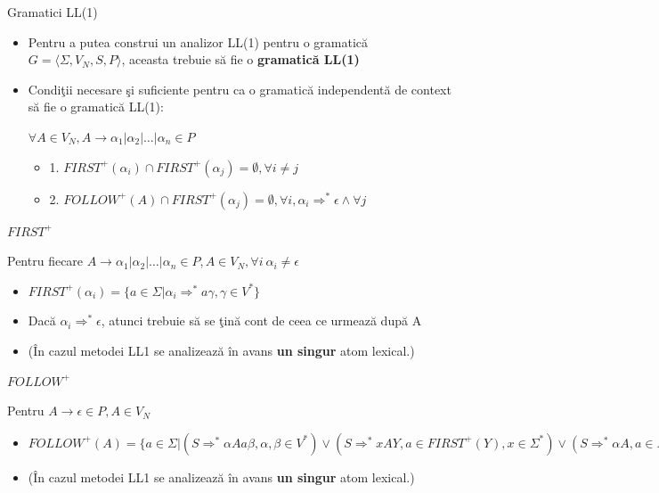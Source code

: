 \documentclass[pdf]{beamer}
\begin{document}
\begin{frame}{Gramatici LL(1)}

\begin{itemize}
\item
Pentru a putea construi un analizor LL(1) pentru o gramatică $G=\langle \Sigma, V_N, S, P \rangle$, aceasta trebuie să fie o \textbf{gramatică LL(1)}

\item
Condiţii necesare şi suficiente pentru ca o gramatică independentă de context să fie o gramatică LL(1):

$\forall A \in V_N, A \to \alpha{_1} | \alpha{_2} | \dots | \alpha{_n} \in P$

\begin{itemize}
\item
1. $FIRST^+(\alpha{_i}) \cap FIRST^+ (\alpha{_j}) =\emptyset, \forall i \neq j$

\item
2. $FOLLOW^+(A) \cap FIRST^+ (\alpha{_j}) = \emptyset, \forall i, \alpha{_i} \Rightarrow^{*} \epsilon \wedge \forall j$
\end{itemize}
\end{itemize}
\end{frame}



\begin{frame}{$FIRST^+$}

Pentru fiecare $A \to \alpha{_1} | \alpha{_2} | \dots | \alpha{_n} \in P, A \in V_N, \forall i \  \alpha_i \neq \epsilon$

\begin{itemize}
\item
$FIRST^+(\alpha_i) = \{ a \in \Sigma | \alpha_i \Rightarrow^* a \gamma, \gamma \in V^{*} \}$

\item
Dacă $\alpha_i \Rightarrow^* \epsilon$, atunci trebuie să se ţină cont de ceea ce urmează după A

\item
(În cazul metodei LL1 se analizează în avans \textbf{un singur }atom lexical.)
\end{itemize}
\end{frame}



\begin{frame}{$FOLLOW^+$}

Pentru $A \to \epsilon \in P, A \in V_N$

\begin{itemize}
\item
$FOLLOW^+(A) = \{ a  \in \Sigma | (S \Rightarrow^* \alpha A a \beta, \alpha,\beta \in V^{*}) \vee ( S \Rightarrow^* xAY, a \in FIRST^+(Y), x \in \Sigma^*) \vee (S \Rightarrow^* \alpha A, a \in FOLLOW^+(S)) \}$

\item
(În cazul metodei LL1 se analizează în avans \textbf{un singur }atom lexical.)
\end{itemize}
\end{frame}
\end{document}
